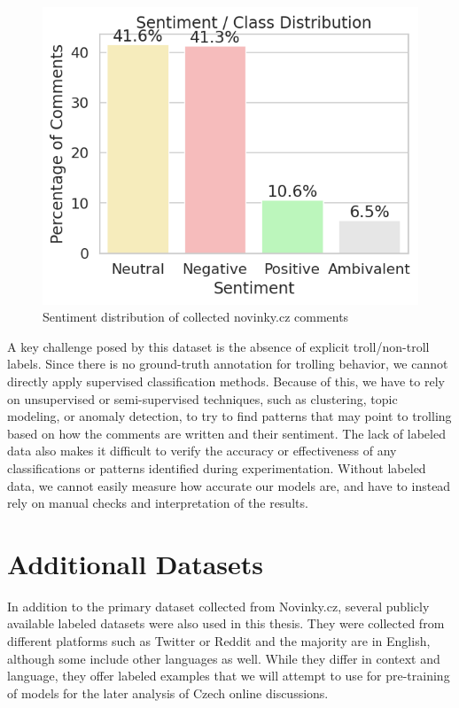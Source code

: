 \documentclass[twoside]{ctuthesis}
\theoremstyle{plain}
\theoremstyle{definition}
\theoremstyle{note}
\begin{document}
\begin{figure}[htbp]          
	\centering                 
	\includegraphics[scale=0.7]{figures/sentiment.png}
	\caption{Sentiment distribution of collected novinky.cz comments}    
	\label{fig:myplot}          
\end{figure}

A key challenge posed by this dataset is the absence of explicit troll/non-troll labels. Since there is no ground-truth annotation for trolling behavior, we cannot directly apply supervised classification methods. Because of this, we have to rely on unsupervised or semi-supervised techniques, such as clustering, topic modeling, or anomaly detection, to try to find patterns that may point to trolling based on how the comments are written and their sentiment. The lack of labeled data also makes it difficult to verify the accuracy or effectiveness of any classifications or patterns identified during experimentation. Without labeled data, we cannot easily measure how accurate our models are, and have to instead rely on manual checks and interpretation of the results.\par

\section{Additionall Datasets}

In addition to the primary dataset collected from Novinky.cz, several publicly available labeled datasets were also used in this thesis. They were collected from different platforms such as Twitter or Reddit and the majority are in English, although some include other languages as well. While they differ in context and language, they offer labeled examples that we will attempt to use for pre-training of models for the later analysis of Czech online discussions.\par
\end{document}
